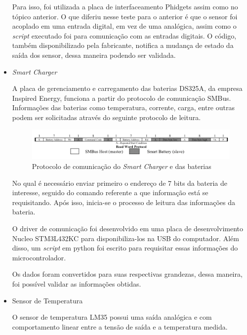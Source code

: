 \begin{itemize}
		Para isso, foi utilizada a placa de interfaceamento Phidgets assim como no tópico anterior. O que diferiu nesse teste para o anterior é que o sensor foi acoplado em uma entrada digital, em vez de uma analógica, assim como o \textit{script} executado foi para comunicação com as entradas digitais. O código, também disponibilizado pela fabricante, notifica a mudança de estado da saída dos sensor, dessa maneira podendo ser validada.
		
		\item \textit{Smart Charger}
		
		A placa de gerenciamento e carregamento das baterias DS325A, da empresa Inspired Energy, funciona a partir do protocolo de comunicação SMBus. Informações das baterias como temperatura, corrente, carga, entre outras podem ser solicitadas através do seguinte protocolo de leitura.
		
		\begin{figure}[!ht]
			\centering
			\includegraphics[width=16cm]{Figures/batt_protocol.png}
			\caption{Protocolo de comunicação do \textit{Smart Charger} e das baterias}
			\label{fig:batt_protocol}
		\end{figure}   
		
		No qual é necessário enviar primeiro o endereço de 7 bits da bateria de interesse, seguido do comando referente a que informação está se requisitando. Após isso, inicia-se o processo de leitura das informações da bateria.
		
		O driver de comunicação foi desenvolvido em uma placa de desenvolvimento Nucleo STM3L432KC para disponibiliza-los na USB do computador. Além disso, um \textit{script} em python foi escrito para requisitar essas informações do microcontrolador.
		
		Os dados foram convertidos para suas respectivas grandezas, dessa maneira, foi possível validar as informações obtidas.
		
		\item Sensor de Temperatura
		
		O sensor de temperatura LM35 possui uma saída analógica e com comportamento linear entre a tensão de saída e a temperatura medida.
		

\end{itemize}
